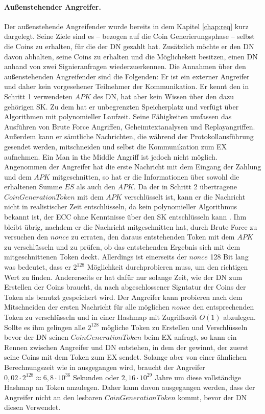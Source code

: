 \documentclass[
	fontsize=11pt,
	headings=small,
	parskip=half,           %
	bibliography=totoc,
	numbers=noenddot,       %
	open=any,               %
]{scrreprt}
\begin{document}
\paragraph{Außenstehender Angreifer.} Der außenstehende Angreifender wurde bereits in dem Kapitel \ref{chap:req} kurz dargelegt. Seine Ziele sind es -- bezogen auf die Coin Generierungsphase -- selbst die Coins zu erhalten, für die der DN gezahlt hat. Zusätzlich möchte er den DN davon abhalten, seine Coins zu erhalten und die Möglichekeit besitzen, einen DN anhand von zwei Signieranfragen wiederzuerkennen. Die Annahmen über den außenstehenden Angreifender sind die Folgenden: Er ist ein externer Angreifer und daher kein vorgesehener Teilnehmer der Kommunikation. Er kennt den in Schritt 1 verwendeten $APK$ des DN, hat aber kein Wissen über den dazu gehörigen SK. Zu dem hat er unbegrenzten Speicherplatz und verfügt über Algorithmen mit polynomieller Laufzeit. Seine Fähigkeiten umfassen das Ausführen von Brute Force Angriffen, Geheimtextanalysen und Replayangriffen. Außerdem kann er sämtliche Nachrichten, die während der Protokollausführung gesendet werden, mitschneiden und selbst die Kommunikation zum EX aufnehmen. Ein Man in the Middle Angriff ist jedoch nicht möglich.\\

Angenommen der Angreifer hat die erste Nachricht mit dem Eingang der Zahlung und dem $APK$ mitgeschnitten, so hat er die Informationen über sowohl die erhaltenen Summe $ES$ als auch den $APK$. Da der in Schritt 2 übertragene $CoinGenerationToken$ mit dem $APK$ verschlüsselt ist, kann er die Nachricht nicht in realistischer Zeit entschlüsseln, da kein polynomieller Algorithmus bekannt ist, der ECC ohne Kenntnisse über den SK entschlüsseln kann \cite{ecc-bos2009security}. Ihm bleibt übrig, nachdem er die Nachricht mitgeschnitten hat, durch Brute Force zu versuchen den $nonce$ zu erraten, den daraus entstehenden Token mit dem $APK$ zu verschlüsseln und zu prüfen, ob das entstehenden Ergebnis sich mit dem mitgeschnittenen Token deckt. Allerdings ist einerseits der $nonce$ 128 Bit lang was bedeutet, dass er $2^{128}$ Möglichkeit durchprobieren muss, um den richtigen Wert zu finden. Andererseits er hat dafür nur solange Zeit, wie der DN zum Erstellen der Coins braucht, da nach abgeschlossener Signtatur der Coins der Token als benutzt gespeichert wird. Der Angreifer kann probieren nach dem Mitschneiden der ersten Nachricht für alle möglichen $nonce$ den entsprechenden Token zu verschlüsseln und in einer Hashmap mit Zugriffszeit $O(1)$ abzulegen. Sollte es ihm gelingen alle $2^{128}$ mögliche Token zu Erstellen und Verschlüsseln bevor der DN seinen $CoinGenerationToken$ beim EX anfragt, so kann ein Rennen zwischen Angreifer und DN entstehen, in dem der gewinnt, der zuerst seine Coins mit dem Token zum EX sendet. Solange aber von einer ähnlichen Berechnungszeit wie in \cite{nofriansyah2018efficiency} ausgegangen wird, braucht der Angreifer $0,02 \cdot 2^{128}\approx 6,8\cdot10^{36}$ Sekunden oder $2,16\cdot10^{29}$ Jahre um diese vollständige Hashmap an Token anzulegen. Daher kann davon ausgegangen werden, dass der Angreifer nicht an den lesbaren $CoinGenerationToken$ kommt, bevor der DN diesen Verwendet.\\
\end{document}
